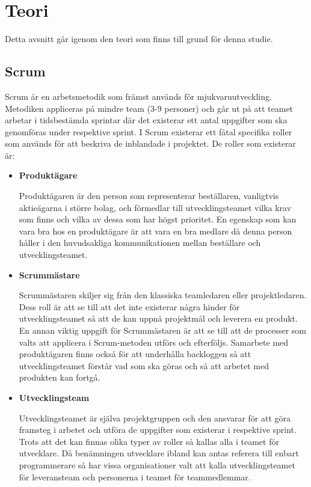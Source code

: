 \section{Teori}
Detta avsnitt går igenom den teori som finns till grund för denna studie.

\subsection{Scrum} \label{adam_scrum}
Scrum är en arbetsmetodik som främst används för mjukvaruutveckling.\cite{scrum} Metodiken appliceras på mindre team (3-9 personer) och går ut på att teamet arbetar i tidsbestämda sprintar där det existerar ett antal uppgifter som ska genomföras under respektive sprint.
I Scrum existerar ett fåtal specifika roller som används för att beskriva de inblandade i projektet. De roller som existerar är:

\begin{itemize}
	\item \textbf{Produktägare}
	
	Produktägaren är den person som representerar beställaren, vanligtvis aktieägarna i större bolag, och förmedlar till utvecklingsteamet vilka krav som finns och vilka av dessa som har högst prioritet. En egenskap som kan vara bra hos en produktägare är att vara en bra medlare då denna person håller i den huvudsakliga kommunikationen mellan beställare och utvecklingsteamet.
	
	\item \textbf{Scrummästare}
	
	Scrummästaren skiljer sig från den klassiska teamledaren eller projektledaren. Dess roll är att se till att det inte existerar några hinder för utvecklingsteamet så att de kan uppnå projektmål och leverera en produkt. En annan viktig uppgift för Scrummästaren är att se till att de processer som valts att applicera i Scrum-metoden utförs och efterföljs. Samarbete med produktägaren finns också för att underhålla backloggen så att utvecklingsteamet förstår vad som ska göras och så att arbetet med produkten kan fortgå.
	
	\item \textbf{Utvecklingsteam}
	
	Utvecklingsteamet är själva projektgruppen och den ansvarar för att göra framsteg i arbetet och utföra de uppgifter som existerar i respektive sprint. Trots att det kan finnas olika typer av roller så kallas alla i teamet för utvecklare. Då benämningen utvecklare ibland kan antas referera till enbart programmerare så har vissa organisationer valt att kalla utvecklingsteamet för leveransteam och personerna i teamet för teammedlemmar.	
\end{itemize}

